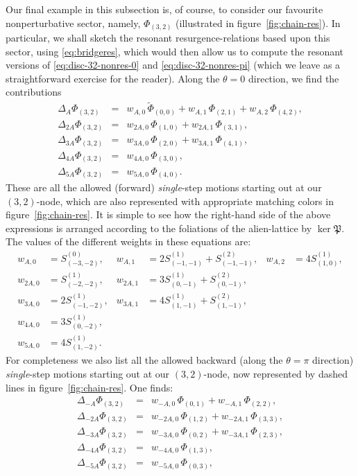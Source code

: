 \documentclass[11pt,a4paper]{article}
\begin{document}
Our final example in this subsection is, of course, to consider our favourite nonperturbative sector, namely, $\Phi_{(3,2)}$ (illustrated in figure~\ref{fig:chain-res}). In particular, we shall sketch the resonant resurgence-relations based upon this sector, using \eqref{eq:bridgeres}, which would then allow us to compute the resonant versions of \eqref{eq:disc-32-nonres-0} and \eqref{eq:disc-32-nonres-pi} (which we leave as a straightforward exercise for the reader). Along the $\theta=0$ direction, we find the contributions
%
\begin{eqnarray}
\Delta_A \Phi_{(3,2)} &=& w_{A,0}\, \widetilde{\Phi}_{(0,0)} + w_{A,1}\, \Phi_{(2,1)} + w_{A,2}\, \Phi_{(4,2)}, \\
\Delta_{2A} \Phi_{(3,2)} &=& w_{2A,0}\, \Phi_{(1,0)} + w_{2A,1}\, \Phi_{(3,1)}, \\
\Delta_{3A} \Phi_{(3,2)} &=& w_{3A,0}\, \Phi_{(2,0)} + w_{3A,1}\, \Phi_{(4,1)}, \\
\Delta_{4A} \Phi_{(3,2)} &=& w_{4A,0}\, \Phi_{(3,0)}, \\
\Delta_{5A} \Phi_{(3,2)} &=& w_{5A,0}\, \Phi_{(4,0)}.
\end{eqnarray}
%
\noindent
These are all the allowed (forward) \textit{single}-step motions starting out at our $(3,2)$-node, which are also represented with appropriate matching colors in figure~\ref{fig:chain-res}. It is simple to see how the right-hand side of the above expressions is arranged according to the foliations of the alien-lattice by $\ker \mathfrak{P}$. The values of the different weights in these equations are:
%
\begin{align}
w_{A,0} &= S^{(0)}_{(-3,-2)}, &w_{A,1} &= 2 S_{(-1,-1)}^{(1)} + S_{(-1,-1)}^{(2)}, &w_{A,2} &= 4 S^{(1)}_{(1,0)}, \\
w_{2A,0} &= S^{(1)}_{(-2,-2)}, &w_{2A,1} &= 3 S^{(1)}_{(0,-1)} + S^{(2)}_{(0,-1)}, \\
w_{3A,0} &= 2 S^{(1)}_{(-1,-2)}, &w_{3A,1} &= 4 S^{(1)}_{(1,-1)} + S^{(2)}_{(1,-1)}, \\
w_{4A,0} &= 3 S^{(1)}_{(0,-2)}, \\
w_{5A,0} &= 4 S^{(1)}_{(1,-2)}.
\end{align}
%
\noindent
For completeness we also list all the allowed backward (along the $\theta=\pi$ direction) \textit{single}-step motions starting out at our $(3,2)$-node, now represented by dashed lines in figure~\ref{fig:chain-res}. One finds:
%
\begin{eqnarray}
\Delta_{-A} \Phi_{(3,2)} &=& w_{-A,0}\, \Phi_{(0,1)} + w_{-A,1}\, \Phi_{(2,2)}, \\
\Delta_{-2A} \Phi_{(3,2)} &=& w_{-2A,0}\, \Phi_{(1,2)} + w_{-2A,1}\, \Phi_{(3,3)}, \\
\Delta_{-3A} \Phi_{(3,2)} &=& w_{-3A,0}\, \Phi_{(0,2)} + w_{-3A,1}\, \Phi_{(2,3)}, \\
\Delta_{-4A} \Phi_{(3,2)} &=& w_{-4A,0}\, \Phi_{(1,3)}, \\
\Delta_{-5A} \Phi_{(3,2)} &=& w_{-5A,0}\, \Phi_{(0,3)},
\end{eqnarray}
\end{document}
